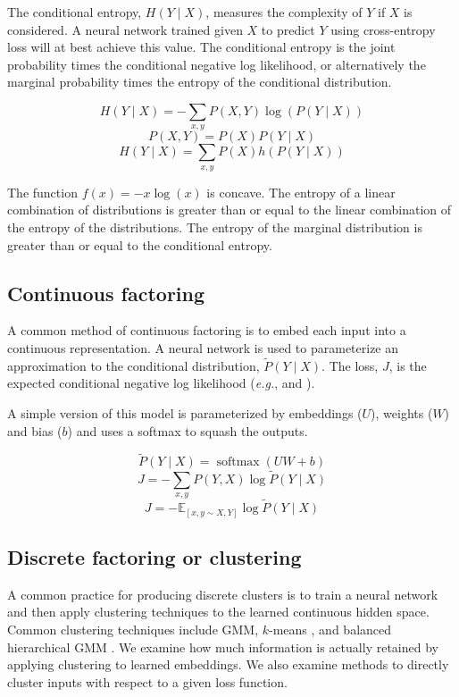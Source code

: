 \documentclass[11pt,letterpaper]{article}
\begin{document}
The conditional entropy, $H(Y \mid X)$, measures the complexity of $Y$ if $X$ is considered. A neural network trained given $X$ to predict $Y$ using cross-entropy loss will at best achieve this value. The conditional entropy is the joint probability times the conditional negative log likelihood, or alternatively the marginal probability times the entropy of the conditional distribution.

$$H(Y \mid X)=-\sum_{x,y} P(X, Y) \log(P(Y \mid X)) $$
$$P(X,Y) = P(X) P(Y \mid X)$$
$$H(Y \mid X)= \sum_{x,y}  P(X) h(P(Y \mid X))$$

The function $f(x)=-x \log(x)$ is concave. The entropy of a linear combination of distributions is greater than or equal to the linear combination of the entropy of the distributions. The entropy of the marginal distribution is greater than or equal to the conditional entropy.

\subsection{Continuous factoring}

A common method of continuous factoring is to embed each input into a continuous representation. A neural network is used to parameterize an approximation to the conditional distribution, $\tilde{P}(Y \mid X)$. The loss, $J$, is the expected conditional negative log likelihood (\textit{e.g.}, \cite{MikolovSCCD13} and \cite{Mikolov1301}).

A simple version of this model is parameterized by embeddings ($U$), weights ($W$) and bias ($b$) and uses a softmax to squash the outputs.

$$ \tilde{P}(Y\mid X) = \operatorname{softmax}(U W+b)$$
$$ J = -\sum_{x, y} P(Y,X) \log \tilde{P}(Y \mid X) $$
$$ J = -\mathbb{E}_{[x,y \sim X, Y]} \log \tilde{P}(Y \mid X) $$

\subsection{Discrete factoring or clustering}

A common practice for producing discrete clusters is to train a neural network and then apply clustering techniques to the learned continuous hidden space. Common clustering techniques include GMM, $k$-means \cite{Lloyd:2006:LSQ:2263356.2269955}, and balanced hierarchical GMM \cite{NIPS2008_3583}. We examine how much information is actually retained by applying clustering to learned embeddings. We also examine methods to directly cluster inputs with respect to a given loss function.
\end{document}
